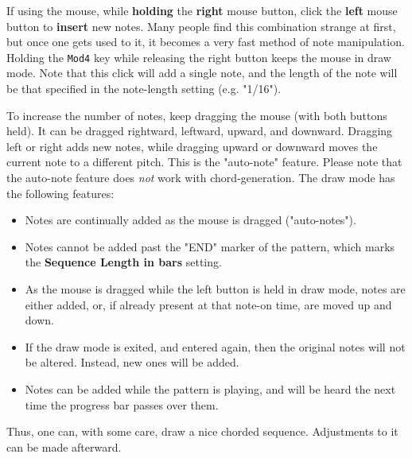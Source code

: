    If using the mouse, while \textbf{holding} the \textbf{right} mouse button,
   click the \textbf{left} mouse button to \textbf{insert} new notes.
   Many people find this combination strange at first, but once one gets used
   to it, it becomes a very fast method of note manipulation.
   Holding the \texttt{Mod4} key while releasing the right button keeps the
   mouse in draw mode.
   Note that this click will add a single note, and the length of the note will
   be that specified in the note-length setting (e.g. "1/16").

   To increase the number of notes, keep dragging the mouse (with
   both buttons held).  It can be dragged rightward, leftward, upward, and
   downward.
   Dragging left or right adds new notes, while dragging upward or
   downward moves the current note to a different pitch.
   This is the "auto-note" feature.
   Please note that the auto-note feature does \textsl{not} work with
   chord-generation.
   The draw mode has the following features:

   \begin{itemize}
      \item Notes are continually added as the mouse is dragged ("auto-notes").
      \item Notes cannot be added past the "END" marker of the pattern, which
         marks the \textbf{Sequence Length in bars} setting.
      \item As the mouse is dragged while the left button is held in draw mode,
         notes are either added, or, if already present at that note-on time,
         are moved up and down.
      \item If the draw mode is exited, and entered again, then the original
         notes will not be altered.  Instead, new ones will be added.
      \item Notes can be added while the pattern is playing, and will be heard
         the next time the progress bar passes over them.
   \end{itemize}

   Thus, one can, with some care, draw a nice chorded sequence.
   Adjustments to it can be made afterward.

